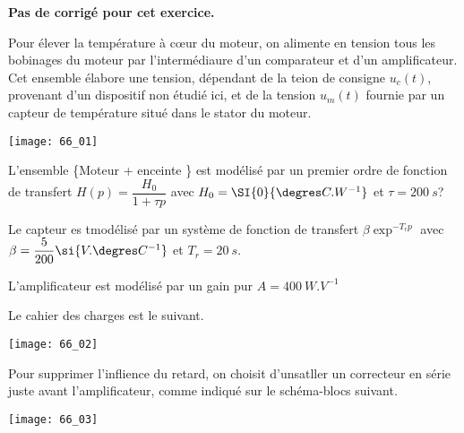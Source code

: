 \normaltrue \difficilefalse \tdifficilefalse
\correctionfalse

\setcounter{numques}{0}


\ifcorrection
\else
\textbf{Pas de corrigé pour cet exercice.}
\fi


\ifprof
\else
Pour élever la température à c\oe{}ur du moteur, on alimente en tension tous les bobinages du moteur par l'intermédiaure d'un comparateur et d'un amplificateur. Cet ensemble élabore une tension, dépendant de la teion de consigne $u_c(t)$, provenant d'un dispositif non étudié ici, et de la tension $u_m(t)$ fournie par un capteur de température situé dans le stator du moteur. 

\begin{center}
\texttt{[image: 66\_01]}
\end{center}


L'ensemble \{Moteur + enceinte \} est modélisé par un premier ordre de fonction de transfert $H(p)=\dfrac{H_0}{1+\tau p}$
avec $H_0 = \SI{0}{\degres C.W^{-1}}$ et $\tau=\SI{200}{s}$?

Le capteur es tmodélisé par un système de fonction de transfert $\beta \exp^{-T_r p}$ avec $\beta = \dfrac{5}{200}\si{V.\degres C^{-1}}$ et $T_r = \SI{20}{s}$.

L'amplificateur est modélisé par un gain pur $A= \SI{400}{W.V^{-1}}$

Le cahier des charges est le suivant. 

\begin{center}
\texttt{[image: 66\_02]}
\end{center}
\fi

\ifprof
\else 
\fi


\ifprof
\else 
Pour supprimer l'inflience du retard, on choisit d'unsatller un correcteur en série juste avant l'amplificateur, comme indiqué sur le schéma-blocs suivant. 

\begin{center}
\texttt{[image: 66\_03]}
\end{center}
\fi

